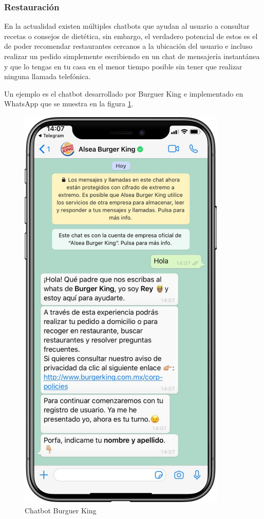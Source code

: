 \subsubsection{Restauración}
En la actualidad existen múltiples chatbots que ayudan al usuario a consultar recetas o consejos de dietética, sin embargo, el verdadero potencial de estos es el de poder recomendar restaurantes cercanos a la ubicación del usuario e incluso realizar un pedido simplemente escribiendo en un chat de mensajería instantánea y que lo tengas en tu casa en el menor tiempo posible sin tener que realizar ninguna llamada telefónica. 

Un ejemplo es el chatbot desarrollado por Burguer King \cite{burguer} e implementado en WhatsApp que se muestra en la figura \ref{fig:burguer}.


\begin{figure}[H]
    \centering
    \includegraphics[scale=0.4]{include/figuras/BurguerKing.png}
    \caption{Chatbot Burguer King}
    \label{fig:burguer}
\end{figure}



